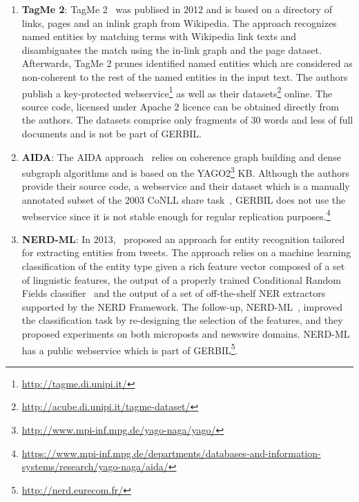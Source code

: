 \begin{enumerate}
\item \textbf{TagMe 2}: TagMe 2~\cite{TagMe2} was publised in 2012 and is based on a directory of links, pages and an inlink graph from Wikipedia.
The approach recognizes named entities by matching terms with Wikipedia link texts and disambiguates the match using the in-link graph and the page dataset.
Afterwards, TagMe 2 prunes identified named entities which are considered as non-coherent to the rest of the named entities in the input text.  
The authors publish a key-protected webservice\footnote{\url{http://tagme.di.unipi.it/}} as well as their datasets\footnote{\url{http://acube.di.unipi.it/tagme-dataset/}} online.
The source code, licensed under Apache 2 licence can be obtained directly from the authors.
The datasets comprise only fragments of 30 words and less of full documents and is not be part of GERBIL. 

\item \textbf{AIDA}: The AIDA approach~\cite{AIDA} relies on coherence graph building and dense subgraph algorithms and is based on the YAGO2\footnote{\url{http://www.mpi-inf.mpg.de/yago-naga/yago/}} \ac{KB}.
Although the authors provide their source code, a webservice and their dataset which is a manually annotated subset of the 2003 CoNLL share task~\cite{conll2003}, GERBIL does not use the webservice since it is not stable enough for regular replication purposes.\footnote{\url{https://www.mpi-inf.mpg.de/departments/databases-and-information-systems/research/yago-naga/aida/}}

\item \textbf{NERD-ML}: In 2013,~\cite{vanErp2013} proposed an approach for entity recognition tailored for extracting entities from tweets. The approach relies on a machine learning classification of the entity type given a rich feature vector composed of a set of linguistic features, the output of a properly trained Conditional Random Fields classifier~\cite{Lafferty:2001:CRF:645530.655813} and the output of a set of off-the-shelf \ac{NER} extractors supported by the NERD Framework. The follow-up, NERD-ML~\cite{rizzo2014}, improved the classification task by re-designing the selection of the features, and they proposed experiments on both microposts and newswire domains.
NERD-ML has a public webservice which is part of GERBIL\footnote{\url{http://nerd.eurecom.fr/}}.



\end{enumerate}
